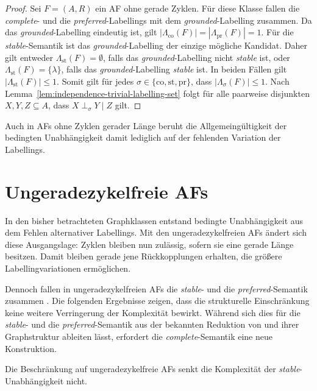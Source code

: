 \begin{proof}
\label{even-cycle-free-af-ci-top-true}
    Sei \(F=(A,R)\) ein AF ohne gerade Zyklen. Für diese Klasse fallen die \emph{complete}- und die \emph{preferred}-Labellings mit dem \emph{grounded}-Labelling zusammen. 
    Da das \emph{grounded}-Labelling eindeutig ist, gilt \(|\Lambda_{\mathrm{co}}(F)|= |\Lambda_{\mathrm{pr}}(F)|=1\).
    Für die \emph{stable}-Semantik ist das \emph{grounded}-Labelling der einzige mögliche Kandidat. 
    Daher gilt entweder \(\Lambda_{\mathrm{st}}(F)=\emptyset\), falls das \emph{grounded}-Labelling nicht \emph{stable} ist, oder \(\Lambda_{\mathrm{st}}(F)=\{\lambda\}\), 
    falls das \emph{grounded}-Labelling \emph{stable} ist. In beiden Fällen gilt \(|\Lambda_{\mathrm{st}}(F)| \leq 1\).
    Somit gilt für jedes \(\sigma \in \{\mathrm{co},\mathrm{st},\mathrm{pr}\}\), dass \(|\Lambda_{\sigma}(F)| \leq 1\). 
    Nach Lemma~\ref{lem:independence-trivial-labelling-set} folgt für alle paarweise disjunkten \(X,Y,Z \subseteq A\), dass \(X \perp_\sigma Y \mid Z\) gilt.
\end{proof}

Auch in AFs ohne Zyklen gerader Länge beruht die Allgemeingültigkeit der 
bedingten Unabhängigkeit damit lediglich auf der fehlenden Variation
der Labellings.  
\section{Ungeradezykelfreie AFs}
\label{sec:odd-cycle-free-afs}
In den bisher betrachteten Graphklassen entstand bedingte Unabhängigkeit aus dem Fehlen 
alternativer Labellings. Mit den ungeradezykelfreien AFs ändert sich diese Ausgangslage: 
Zyklen bleiben nun zulässig, sofern sie eine gerade Länge besitzen. Damit bleiben gerade 
jene Rückkopplungen erhalten, die größere Labellingvariationen ermöglichen. 

Dennoch fallen in ungeradezykelfreien AFs die \emph{stable}- und die \emph{preferred}-Semantik zusammen \cite{DUNNE2002187}.
Die folgenden Ergebnisse zeigen, dass die strukturelle Einschränkung keine weitere Verringerung 
der Komplexität bewirkt. Während sich dies für die \emph{stable}- und die \emph{preferred}-Semantik 
aus der bekannten Reduktion von \textcite{bluemel:2025:independence-aba} und ihrer Graphstruktur ableiten lässt, 
erfordert die \emph{complete}-Semantik eine neue Konstruktion.

Die Beschränkung auf ungeradezykelfreie AFs senkt die Komplexität der \emph{stable}-Unabhängigkeit nicht.

